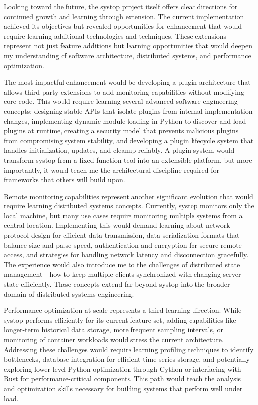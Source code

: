 \documentclass[12pt,a4paper]{article}
\begin{document}
Looking toward the future, the systop project itself offers clear directions for continued growth and learning through extension. The current implementation achieved its objectives but revealed opportunities for enhancement that would require learning additional technologies and techniques. These extensions represent not just feature additions but learning opportunities that would deepen my understanding of software architecture, distributed systems, and performance optimization.

The most impactful enhancement would be developing a plugin architecture that allows third-party extensions to add monitoring capabilities without modifying core code. This would require learning several advanced software engineering concepts: designing stable APIs that isolate plugins from internal implementation changes, implementing dynamic module loading in Python to discover and load plugins at runtime, creating a security model that prevents malicious plugins from compromising system stability, and developing a plugin lifecycle system that handles initialization, updates, and cleanup reliably. A plugin system would transform systop from a fixed-function tool into an extensible platform, but more importantly, it would teach me the architectural discipline required for frameworks that others will build upon.

Remote monitoring capabilities represent another significant evolution that would require learning distributed systems concepts. Currently, systop monitors only the local machine, but many use cases require monitoring multiple systems from a central location. Implementing this would demand learning about network protocol design for efficient data transmission, data serialization formats that balance size and parse speed, authentication and encryption for secure remote access, and strategies for handling network latency and disconnection gracefully. The experience would also introduce me to the challenges of distributed state management—how to keep multiple clients synchronized with changing server state efficiently. These concepts extend far beyond systop into the broader domain of distributed systems engineering.

Performance optimization at scale represents a third learning direction. While systop performs efficiently for its current feature set, adding capabilities like longer-term historical data storage, more frequent sampling intervals, or monitoring of container workloads would stress the current architecture. Addressing these challenges would require learning profiling techniques to identify bottlenecks, database integration for efficient time-series storage, and potentially exploring lower-level Python optimization through Cython or interfacing with Rust for performance-critical components. This path would teach the analysis and optimization skills necessary for building systems that perform well under load.
\end{document}
